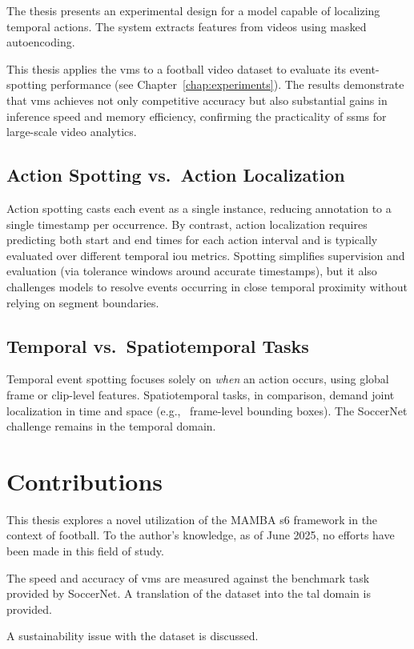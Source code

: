 The thesis presents an experimental design for a model capable of localizing temporal actions. The system extracts features from videos using masked autoencoding.

This thesis applies the \acrlong{vms} to a football video dataset to evaluate its event-spotting performance (see Chapter~\ref{chap:experiments}). The results demonstrate that \acrshort{vms} achieves not only competitive accuracy but also substantial gains in inference speed and memory efficiency, confirming the practicality of \acrfull{ssm}s for large-scale video analytics. 

\subsection{Action Spotting vs.\ Action Localization}
Action spotting casts each event as a single instance, reducing annotation to a single timestamp per occurrence. By contrast, action localization requires predicting both start and end times for each action interval and is typically evaluated over different temporal \acrfull{iou} metrics. Spotting simplifies supervision and evaluation (via tolerance windows around accurate timestamps), but it also challenges models to resolve events occurring in close temporal proximity without relying on segment boundaries.

\subsection{Temporal vs.\ Spatiotemporal Tasks}
Temporal event spotting focuses solely on \emph{when} an action occurs, using global frame or clip-level features. Spatiotemporal tasks, in comparison, demand joint localization in time and space (e.g., \ frame-level bounding boxes). The SoccerNet challenge remains in the temporal domain.

\section{Contributions}

This thesis explores a novel utilization of the MAMBA \acrshort{s6} framework in the context of football. To the author's knowledge, as of June 2025, no efforts have been made in this field of study. 

The speed and accuracy of \acrlong{vms} are measured against the benchmark task provided by SoccerNet. A translation of the dataset into the \acrfull{tal} domain is provided. 

A sustainability issue with the dataset is discussed. 


